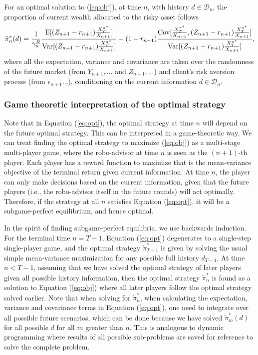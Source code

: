 \begin{theorem}\label{thm:optimal} For an optimal solution to (\ref{eq:obj}), at time $n$, with history $d\in \mathcal{D}_n$, the proportion of current wealth allocated to the risky asset follows
    \begin{equation}\label{eq:opt}
    \tilde\pi_n^*(d)=\frac{1}{\gamma_n^R} \frac{\mathrm{E}[(Z_{n+1}-r_{n+1})\frac{X_T^{\pi^*}}{X_{n+1}}]}{\mathrm{Var}[(Z_{n+1}-r_{n+1})\frac{X_T^{\pi^*}}{X_{n+1}}]}-(1+r_{n+1})\frac{\mathrm{Cov}[\frac{X_T^{\pi^*}}{X_{n+1}},(Z_{n+1}-r_{n+1})\frac{X_T^{\pi^*}}{X_{n+1}}]}{\mathrm{Var}[(Z_{n+1}-r_{n+1})\frac{X_T^{\pi^*}}{X_{n+1}}]},
\end{equation} where all the expectation, variance and covariance are taken over the randomness of the future market (from $Y_{n+1},\ldots$ and $Z_{n+1},\ldots$) and client's risk aversion process (from $\epsilon_{n+1}\ldots$), conditioning on the current information $d\in\mathcal{D}_n$.
\end{theorem}

\subsubsection{Game theoretic interpretation of the optimal strategy}

Note that in Equation (\ref{eq:opt}), the optimal strategy at time $n$ will depend on the future optimal strategy. This can be interpreted in a game-theoretic way. We can treat finding the optimal strategy to maximize (\ref{eq:obj}) as a multi-stage multi-player game, where the robo-advisor at time $n$ is seen as the $(n+1)$-th player. Each player has a reward function to maximize that is the mean-variance objective of the terminal return given current information. At time $n$, the player can only make decisions based on the current information, given that the future players (i.e., the robo-advisor itself in the future rounds) will act optimally. Therefore, if the strategy at all $n$ satisfies Equation (\ref{eq:opt}), it will be a subgame-perfect equilibrium, and hence optimal.

In the spirit of finding subgame-perfect equilibria, we use backwards induction. For the terminal time $n=T-1$, Equation (\ref{eq:opt}) degenerates to a single-step single-player game, and the optimal strategy $\tilde\pi_{T-1}^*$ is given by solving the usual simple mean-variance maximization for any possible full history $d_{T-1}$. At time $n<T-1$, assuming that we have solved the optimal strategy of later players given all possible history information, then the optimal strategy $\tilde\pi_n^*$ is found as a solution to Equation (\ref{eq:obj}) where all later players follow the optimal strategy solved earlier. Note that when solving for $\tilde\pi_n^*$, when calculating the expectation, variance and covariance terms in Equation (\ref{eq:opt}), one need to integrate over all possible future scenarios, which can be done because we have solved $\tilde\pi_m^*(d)$ for all possible $d$ for all $m$ greater than $n$. This is analogous to dynamic programming where results of all possible sub-problems are saved for reference to solve the complete problem.

